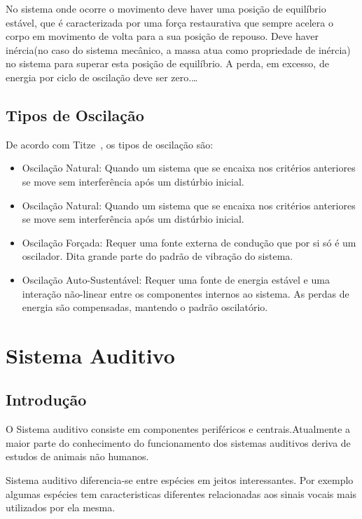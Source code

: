 		
		No sistema onde ocorre o movimento deve haver uma posição de equilíbrio estável, que é caracterizada por uma força restaurativa que sempre acelera o corpo em	movimento de volta para a sua posição de repouso.
		Deve haver inércia(no caso do sistema mecânico, a massa atua como propriedade de inércia) no sistema para superar esta posição de equilíbrio.
		A perda, em excesso, de energia por ciclo de oscilação deve ser zero.\ldots 
	
	\subsection{Tipos de Oscilação}
			De acordo com Titze~\cite{IngoTitze}, os tipos de oscilação são:
			\begin{itemize}
				\item  Oscilação Natural: Quando um sistema que se encaixa nos critérios anteriores se move sem interferência após um distúrbio inicial.
				\item Oscilação Natural: Quando um sistema que se encaixa nos critérios anteriores se move sem interferência após um distúrbio inicial.
				\item Oscilação Forçada: Requer uma fonte externa de condução que por si só é um
				oscilador. Dita grande parte do padrão de vibração do sistema.
				\item Oscilação Auto-Sustentável: Requer uma fonte de energia estável e uma interação não-linear entre os componentes internos ao sistema. As perdas de energia são compensadas, mantendo o padrão oscilatório.
			\end{itemize}
		






	\section{Sistema Auditivo}
	\subsection{Introdução}
	O Sistema auditivo consiste em componentes periféricos e centrais.Atualmente a maior parte do conhecimento do funcionamento dos sistemas auditivos deriva de estudos de animais não humanos.\cite{Foundation1} 
	
	Sistema auditivo diferencia-se entre espécies em jeitos interessantes.
	Por exemplo algumas espécies tem caracteristicas diferentes relacionadas aos sinais vocais mais utilizados por ela mesma.\cite{Foundation1}
	

